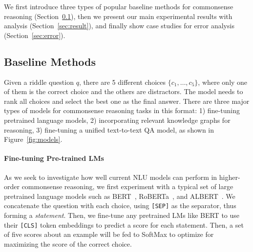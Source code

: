 We first introduce three types of popular baseline methods for commonsense reasoning (Section~\ref{sec:baseline}), then we present our main experimental results with analysis (Section~\ref{sec:result}), and finally show case studies for error analysis (Section~\ref{sec:error}). 

\subsection{Baseline Methods}
\label{sec:baseline}
Given a riddle question $q$, there are 5 different choices $\{c_1, \dots, c_5\}$, where only one of them is the correct choice and the others are distractors.
The model needs to rank all choices and select the best one as the final answer.
There are three major types of models for commonsense reasoning tasks in this format: 
1) fine-tuning pretrained language models, 
2) incorporating relevant knowledge graphs for reasoning, 
3) fine-tuning a unified text-to-text QA model, 
as shown in Figure~\ref{fig:models}.


\paragraph{Fine-tuning Pre-trained LMs}
As we seek to investigate how well current NLU models can perform in higher-order commonsense reasoning,
we first experiment with a typical set of large pretrained language models such as BERT~\cite{Devlin2019BERTPO}, RoBERTa~\cite{Liu2019RoBERTaAR}, 
and ALBERT~\cite{Lan2020ALBERT}.
We concatenate the question with each choice, using \texttt{[SEP]} as the separator, thus forming a \textit{statement}.
Then, we fine-tune any pretrained LMs like BERT to use their \texttt{[CLS]}  token embeddings to predict a score for each statement.
Then, a set of five scores about an example will be fed to SoftMax to optimize for maximizing the score of the correct choice.


